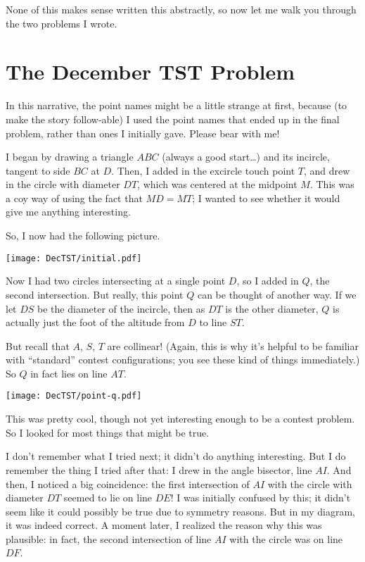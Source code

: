 \documentclass[11pt]{scrartcl}
\begin{document}
None of this makes sense written this abstractly,
so now let me walk you through the two problems I wrote.

\eject

\section{The December TST Problem}
In this narrative, the point names might be a little strange at first,
because (to make the story follow-able) I used the point
names that ended up in the final problem,
rather than ones I initially gave.
Please bear with me!

I began by drawing a triangle $ABC$ (always a good start\dots)
and its incircle, tangent to side $BC$ at $D$.
Then, I added in the excircle touch point $T$,
and drew in the circle with diameter $DT$, which was
centered at the midpoint $M$.
This was a coy way of using the fact that $MD = MT$;
I wanted to see whether it would give me anything interesting.

So, I now had the following picture.
\begin{center}
  \texttt{[image: DecTST/initial.pdf]}
\end{center}

Now I had two circles intersecting at a single point $D$,
so I added in $Q$, the second intersection.
But really, this point $Q$ can be thought of another way.
If we let $DS$ be the diameter of the incircle,
then as $DT$ is the other diameter, $Q$ is actually just the
foot of the altitude from $D$ to line $ST$.

But recall that $A$, $S$, $T$ are collinear!
(Again, this is why it's helpful to be familiar with ``standard''
contest configurations; you see these kind of things immediately.)
So $Q$ in fact lies on line $AT$.

\begin{center}
  \texttt{[image: DecTST/point-q.pdf]}
\end{center}

This was pretty cool, though not yet interesting enough to be
a contest problem. So I looked for most things that might be true.

I don't remember what I tried next; it didn't do anything interesting.
But I do remember the thing I tried after that:
I drew in the angle bisector, line $AI$.
And then, I noticed a big coincidence:
the first intersection of $AI$ with the circle with diameter $DT$
seemed to lie on line $DE$!
I was initially confused by this; it didn't seem like it could
possibly be true due to symmetry reasons.
But in my diagram, it was indeed correct.
A moment later, I realized the reason why this was plausible:
in fact, the second intersection of line $AI$ with the circle
was on line $DF$.
\end{document}
